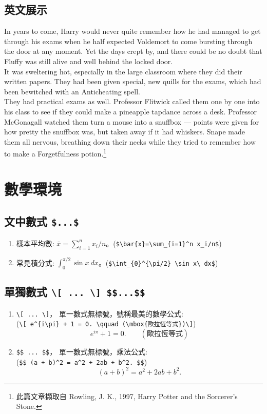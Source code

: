 \subsection{英文展示}
{\A In years to come, Harry would never quite remember how he had managed to get through his exams when he half expected Voldemort to come bursting through the door at any moment. Yet the days crept by, and there could be no doubt that Fluffy was still alive and well behind the locked door.}\\
It was sweltering hot, especially in the large classroom where they did their written papers. They had been given special, new quills for the exams, which had been bewitched with an Anticheating spell.\\
{\E They had practical exams as well. Professor Flitwick called them one by one into his class to see if they could make a pineapple tapdance across a desk. Professor McGonagall watched them turn a mouse into a snuffbox — points were given for how pretty the snuffbox was, but taken away if it had whiskers. Snape made them all nervous, breathing down their necks while they tried to remember how to make a Forgetfulness potion.}\footnote{此篇文章擷取自 Rowling, J. K., 1997, Harry Potter and the Sorcerer's Stone.}\bigskip
\section{數學環境}
\subsection{文中數式 {\tt \$...\$}}
\begin{enumerate}
\item
樣本平均數: $\bar{x} = \sum_{i = 1}^n x_i/n$。(\verb|$\bar{x}=\sum_{i=1}^n x_i/n$|)
\item
常見積分式: $\int_{0}^{\pi/2} \sin x\ dx$。(\verb|$\int_{0}^{\pi/2} \sin x\ dx$|)
\end{enumerate}
\subsection{單獨數式 {\tt \textbackslash[ ... \textbackslash] \$\$...\$\$}}
\begin{enumerate}
\item 
\verb|\[ ... \]|， 單一數式無標號，號稱最美的數學公式: \\
(\verb|\[ e^{i\pi} + 1 = 0. \qquad (\mbox{歐拉恆等式})\]|)
\[ e^{i\pi} + 1 = 0. \qquad (\mbox{歐拉恆等式})\]
\item
\verb|$$ ... $$|， 單一數式無標號，乘法公式: \\
(\verb|$$ (a + b)^2 = a^2 + 2ab + b^2. $$|)
$$
(a + b)^2 = a^2 + 2ab + b^2.
$$
\end{enumerate}\bigskip
